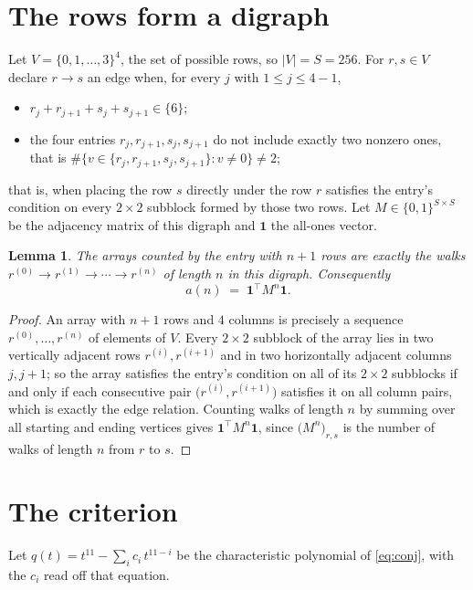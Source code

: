 \documentclass[11pt,a4paper]{article}
\theoremstyle{plain}
\newtheorem{lemma}[theorem]{Lemma}
\theoremstyle{definition}
\begin{document}
\section{The rows form a digraph}

Let $V=\{0,1,\dots,3\}^{4}$, the set of possible rows, so $|V|=S=256$. For
$r,s\in V$ declare $r\to s$ an edge when, for every $j$ with $1\le j\le 4-1$,
\begin{itemize}
\item $r_j+r_{j+1}+s_j+s_{j+1}\in\{6\}$;
\item the four entries $r_j,r_{j+1},s_j,s_{j+1}$ do not include exactly two nonzero ones, that is $\#\bigl\{v\in\{r_j,r_{j+1},s_j,s_{j+1}\}: v\ne0\bigr\}\ne2$;
\end{itemize}
that is, when placing the row $s$ directly under the row $r$ satisfies the entry's
condition on every $2\times2$ subblock formed by those two rows. Let $M\in\{0,1\}^{S\times
S}$ be the adjacency matrix of this digraph and $\mathbf{1}$ the all-ones vector.

\begin{lemma}\label{lem:walk}
The arrays counted by the entry with $n+1$ rows are exactly the walks
$r^{(0)}\to r^{(1)}\to\cdots\to r^{(n)}$ of length $n$ in this digraph. Consequently
\[
a(n)\;=\;\mathbf{1}^{\!\top}M^{n}\mathbf{1} .
\]
\end{lemma}

\begin{proof}
An array with $n+1$ rows and $4$ columns is precisely a sequence
$r^{(0)},\dots,r^{(n)}$ of elements of $V$. Every $2\times2$ subblock of the array lies
in two vertically adjacent rows $r^{(i)},r^{(i+1)}$ and in two horizontally adjacent
columns $j,j+1$; so the array satisfies the entry's condition on all of its $2\times2$
subblocks if and only if each consecutive pair $\bigl(r^{(i)},r^{(i+1)}\bigr)$ satisfies
it on all column pairs, which is exactly the edge relation. Counting walks of length $n$ by
summing over all starting and ending vertices gives
$\mathbf{1}^{\!\top}M^{n}\mathbf{1}$, since
$\bigl(M^{n}\bigr)_{r,s}$ is the number of walks of length $n$ from $r$ to $s$.
\end{proof}

\section{The criterion}

Let $q(t)=t^{11}-\sum_{i}c_i\,t^{11-i}$ be the characteristic polynomial of
\eqref{eq:conj}, with the $c_i$ read off that equation.
\end{document}
